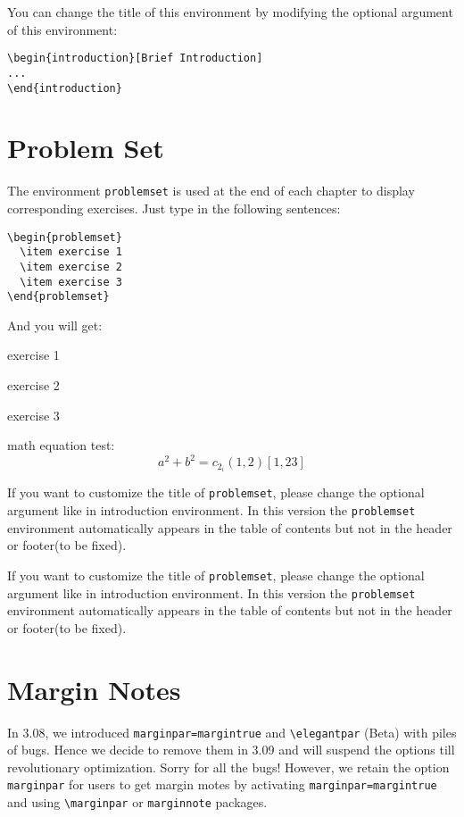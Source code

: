 \documentclass[11pt]{elegantbook}
\begin{document}
You can change the title of this environment by modifying the optional argument of this environment:
\begin{lstlisting}
\begin{introduction}[Brief Introduction]
...
\end{introduction}
\end{lstlisting}

\section{Problem Set}
The environment \lstinline{problemset} is used at the end of each chapter to display corresponding exercises. Just type in the following sentences:
\begin{lstlisting}
\begin{problemset}
  \item exercise 1
  \item exercise 2
  \item exercise 3
\end{problemset}
\end{lstlisting}
And you will get:
\begin{problemset}
  \item exercise 1
  \item exercise 2
  \item exercise 3
  \item math equation test:
  \begin{equation}
  a^2+b^2=c_{2_{i}} (1,2) [1,23]
  \end{equation}
\end{problemset}
\begin{remark}
If you want to customize the title of \lstinline{problemset}, please change the optional argument like in introduction environment. In this version the \lstinline{problemset} environment automatically appears in the table of contents but not in the header or footer(to be fixed).
\end{remark}

\begin{solution}
  If you want to customize the title of \lstinline{problemset}, please change the optional argument like in introduction environment. In this version the \lstinline{problemset} environment automatically appears in the table of contents but not in the header or footer(to be fixed).
\end{solution}

\section{Margin Notes}
In 3.08, we introduced \lstinline{marginpar=margintrue} and \lstinline{\elegantpar} (Beta) with piles of bugs. Hence we decide to remove them in 3.09 and will suspend the options till revolutionary optimization. Sorry for all the bugs! However, we retain the option \lstinline{marginpar} for users to get margin motes by activating \lstinline{marginpar=margintrue} and using \lstinline{\marginpar} or \lstinline{marginnote} packages.
\end{document}
